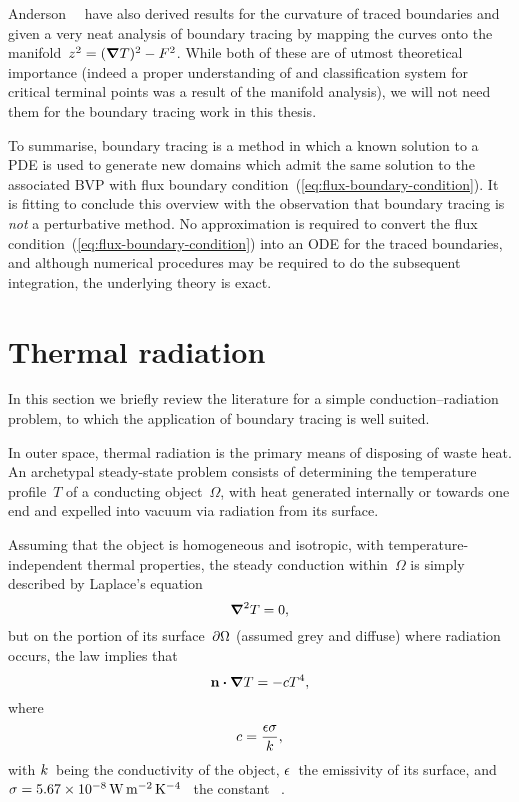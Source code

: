 Anderson~\etal~\cite{anderson-2007-boundary-tracing-i-theory}
have also derived results for the curvature of traced boundaries
and given a very neat analysis of boundary tracing
by mapping the curves onto the manifold~$z^2 = (\mathop{}\!\boldsymbol{\mathbf{\nabla}} T)^2 - F^2$.
While both of these are of utmost theoretical importance
(indeed a proper understanding of and classification system for
critical terminal points was a result of the manifold analysis),
we will not need them for the boundary tracing work in this thesis.

To summarise, boundary tracing is a method in which
a known solution to a PDE is used
to generate new domains which admit the same solution
to the associated BVP
with flux boundary condition~(\ref{eq:flux-boundary-condition}).
It is fitting to conclude this overview with the observation that
boundary tracing is \emph{not} a perturbative method.
No approximation is required
to convert the flux condition~(\ref{eq:flux-boundary-condition})
into an ODE for the traced boundaries,
and although numerical procedures may be required
to do the subsequent integration,
the underlying theory is exact.

\section{Thermal radiation}
\label{sec:introduction.radiation}

In this section
we briefly review the literature for
a simple conduction--radiation problem,
to which the application of boundary tracing is well suited.

In outer space,
thermal radiation is the primary means of disposing of waste heat.
An archetypal steady-state problem consists of
determining the temperature profile~$T$ of a conducting object~$\Omega$,
with heat generated internally or towards one end
and expelled into vacuum via radiation from its surface.

Assuming that the object is homogeneous and isotropic,
with temperature-independent thermal properties,
the steady conduction within~$\Omega$
is simply described by Laplace's equation
\begin{equation}
  \mathop{}\!\boldsymbol{\mathbf{\nabla}}^2 T = 0,
  \label{eq:laplace-steady-conduction}
\end{equation}
but on the portion of its surface~$\mathop{}\!\partial \Omega$
(assumed grey and diffuse) where radiation occurs,
the \stefanboltz{} law implies that
\begin{equation}
  \mathop{}\!\boldsymbol{\mathbf{n}} \boldsymbol{\cdot} \mathop{}\!\boldsymbol{\mathbf{\nabla}} T = - c T^4,
  \label{eq:radiation-boundary-condition}
\end{equation}
where
\begin{equation}
  c = \frac{\epsilon \sigma}{k},
  \label{eq:radiation-constant}
\end{equation}
with $k$~being the conductivity of the object,
$\epsilon$~the emissivity of its surface,
and $\stefan = \SI{5.67e-8}{\watt \per\metre\squared \per\kelvin\tothe{4}}$~%
the \stefanboltz{} constant~%
\cite{tiesinga-2019-2018-codata-recommended-constants}.

